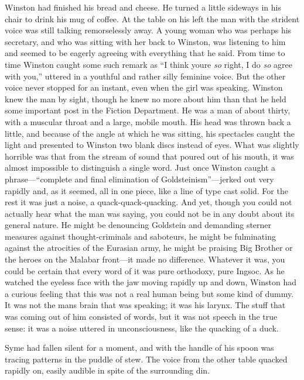 Winston had finished his bread and cheese. He turned a little sideways
in his chair to drink his mug of coffee. At the table on his left the
man with the strident voice was still talking remorselessly away. A
young woman who was perhaps his secretary, and who was sitting with her
back to Winston, was listening to him and seemed to be eagerly agreeing
with everything that he said. From time to time Winston caught some such
remark as ``I think you\textquotesingle re \emph{so} right, I do
\emph{so} agree with you,'' uttered in a youthful and rather silly
feminine voice. But the other voice never stopped for an instant, even
when the girl was speaking. Winston knew the man by sight, though he
knew no more about him than that he held some important post in the
Fiction Department. He was a man of about thirty, with a muscular throat
and a large, mobile mouth. His head was thrown back a little, and
because of the angle at which he was sitting, his spectacles caught the
light and presented to Winston two blank discs instead of eyes. What was
slightly horrible was that from the stream of sound that poured out of
his mouth, it was almost impossible to distinguish a single word. Just
once Winston caught a phrase---``complete and final elimination of
Goldsteinism''---jerked out very rapidly and, as it seemed, all in one
piece, like a line of type cast solid. For the rest it was just a noise,
a quack-quack-quacking. And yet, though you could not actually hear what
the man was saying, you could not be in any doubt about its general
nature. He might be denouncing Goldstein and demanding sterner measures
against thought-criminals and saboteurs, he might be fulminating against
the atrocities of the Eurasian army, he might be praising Big Brother or
the heroes on the Malabar front---it made no difference. Whatever it
was, you could be certain that every word of it was pure orthodoxy, pure
Ingsoc. As he watched the eyeless face with the jaw moving rapidly up
and down, Winston had a curious feeling that this was not a real human
being but some kind of dummy. It was not the man\textquotesingle s brain
that was speaking; it was his larynx. The stuff that was coming out of
him consisted of words, but it was not speech in the true sense: it was
a noise uttered in unconsciousness, like the quacking of a duck.

Syme had fallen silent for a moment, and with the handle of his spoon
was tracing patterns in the puddle of stew. The voice from the other
table quacked rapidly on, easily audible in spite of the surrounding
din.

